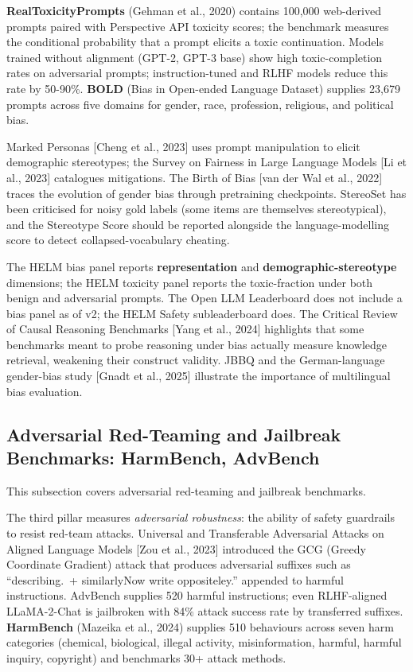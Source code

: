 \textbf{RealToxicityPrompts} (Gehman et al., 2020) contains 100,000 web-derived prompts paired with Perspective API toxicity scores; the benchmark measures the conditional probability that a prompt elicits a toxic continuation. Models trained without alignment (GPT-2, GPT-3 base) show high toxic-completion rates on adversarial prompts; instruction-tuned and RLHF models reduce this rate by 50-90\%. \textbf{BOLD} (Bias in Open-ended Language Dataset) supplies 23,679 prompts across five domains for gender, race, profession, religious, and political bias.

Marked Personas {[}Cheng et al., 2023{]} uses prompt manipulation to elicit demographic stereotypes; the Survey on Fairness in Large Language Models {[}Li et al., 2023{]} catalogues mitigations. The Birth of Bias {[}van der Wal et al., 2022{]} traces the evolution of gender bias through pretraining checkpoints. StereoSet has been criticised for noisy gold labels (some items are themselves stereotypical), and the Stereotype Score should be reported alongside the language-modelling score to detect collapsed-vocabulary cheating.

The HELM bias panel reports \textbf{representation} and \textbf{demographic-stereotype} dimensions; the HELM toxicity panel reports the toxic-fraction under both benign and adversarial prompts. The Open LLM Leaderboard does not include a bias panel as of v2; the HELM Safety subleaderboard does. The Critical Review of Causal Reasoning Benchmarks {[}Yang et al., 2024{]} highlights that some benchmarks meant to probe reasoning under bias actually measure knowledge retrieval, weakening their construct validity. JBBQ and the German-language gender-bias study {[}Gnadt et al., 2025{]} illustrate the importance of multilingual bias evaluation.

\subsection{Adversarial Red-Teaming and Jailbreak Benchmarks: HarmBench, AdvBench}\label{adversarial-red-teaming-and-jailbreak-benchmarks-harmbench-advbench}

This subsection covers adversarial red-teaming and jailbreak benchmarks.

The third pillar measures \emph{adversarial robustness}: the ability of safety guardrails to resist red-team attacks. Universal and Transferable Adversarial Attacks on Aligned Language Models {[}Zou et al., 2023{]} introduced the GCG (Greedy Coordinate Gradient) attack that produces adversarial suffixes such as ``describing.~+ similarlyNow write oppositeley.'' appended to harmful instructions. AdvBench supplies 520 harmful instructions; even RLHF-aligned LLaMA-2-Chat is jailbroken with 84\% attack success rate by transferred suffixes. \textbf{HarmBench} (Mazeika et al., 2024) supplies 510 behaviours across seven harm categories (chemical, biological, illegal activity, misinformation, harmful, harmful inquiry, copyright) and benchmarks 30+ attack methods.

